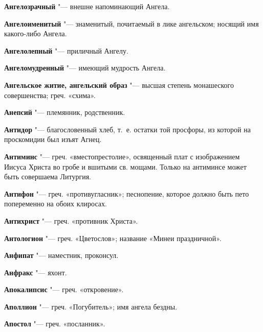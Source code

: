 \begin{mymulticols}{2}
\noindent\textbf{Ангелозрачный} "--- внешне напоминающий Ангела. 




\noindent\textbf{Ангелоименитый} "--- знаменитый, почитаемый в лике ангельском; носящий имя какого-либо Ангела. 




\noindent\textbf{Ангелолепный} "--- приличный Ангелу. 




\noindent\textbf{Ангеломудренный} "--- имеющий мудрость Ангела. 




\noindent\textbf{Ангельское житие, ангельский образ} "--- высшая степень монашеского совершенства; греч. «схима». 




\noindent\textbf{Анепсий} "--- племянник, родственник. 




\noindent\textbf{Антидор} "--- благословенный хлеб, т.~е. остатки той просфоры, из которой на проскомидии был изъят Агнец. 




\noindent\textbf{Антиминс} "--- греч. «вместопрестолие», освященный плат с изображением Иисуса Христа во гробе и вшитыми св. мощами. Только на антиминсе может быть совершаема Литургия. 




\noindent\textbf{Антифон} "--- греч. «противугласник»; песнопение, которое должно быть пето попеременно на обоих клиросах. 




\noindent\textbf{Антихрист} "--- греч. «противник Христа». 




\noindent\textbf{Антологион} "--- греч. «Цветослов»; название «Минеи праздничной». 




\noindent\textbf{Анфипат} "--- наместник, проконсул. 




\noindent\textbf{Анфракс} "--- яхонт. 




\noindent\textbf{Апокалипсис} "--- греч. «откровение». 




\noindent\textbf{Аполлион} "--- греч. «Погубитель»; имя ангела бездны. 




\noindent\textbf{Апостол} "--- греч. «посланник». 





\end{mymulticols}

